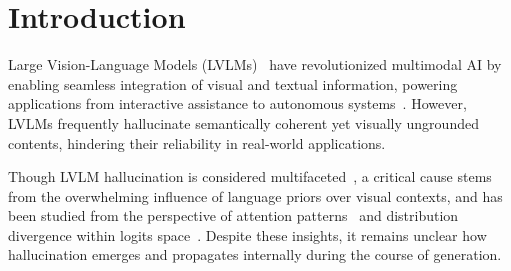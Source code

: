 \documentclass{article}
\theoremstyle{plain}
\theoremstyle{definition}
\theoremstyle{remark}
\begin{document}
\section{Introduction}
\label{sec:intro}

Large Vision-Language Models (LVLMs)~\cite{instructblip, qwen, shikra, minigpt4, llava} have revolutionized multimodal AI by enabling seamless integration of visual and textual information, powering applications from interactive assistance to autonomous systems~\cite{ lin2023video, yang2024gpt4tools, lai2024lisa}. However, LVLMs frequently hallucinate semantically coherent yet visually ungrounded contents, hindering their reliability in real-world applications.

Though LVLM hallucination is considered multifaceted~\cite{liu2024survey}, a critical cause stems from the overwhelming influence of language priors over visual contexts, and has been studied from the perspective of attention patterns~\cite{opera, pai} and distribution divergence within logits space~\cite{vcd, favero2024multi}. Despite these insights, it remains unclear how hallucination emerges and propagates internally during the course of generation. 
\end{document}
